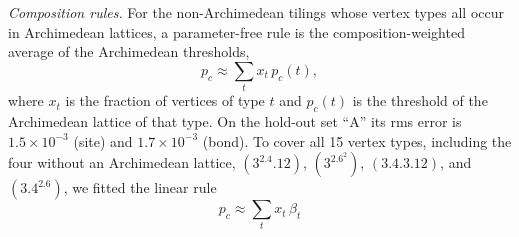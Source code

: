 \documentclass[pre,twocolumn,superscriptaddress,longbibliography,floatfix]{revtex4-2}
\newcommand{\pc}{p_c}
\begin{document}
\textit{Composition rules.} For the non-Archimedean tilings whose vertex types all occur in Archimedean lattices, a parameter-free rule is the composition-weighted average of the Archimedean thresholds,
\begin{equation}
\pc\approx\sum_t x_t\,\pc(t),
\label{eq:avg}
\end{equation}
where $x_t$ is the fraction of vertices of type $t$ and $\pc(t)$ is the threshold of the Archimedean lattice of that type. On the hold-out set ``A'' its rms error is $1.5\times10^{-3}$ (site) and $1.7\times10^{-3}$ (bond). To cover all 15 vertex types, including the four without an Archimedean lattice, $(3^2.4.12)$, $(3^2.6^2)$, $(3.4.3.12)$, and $(3.4^2.6)$, we fitted the linear rule
\begin{equation}
\pc\approx\sum_t x_t\,\beta_t
\label{eq:mix}
\end{equation}
\end{document}
